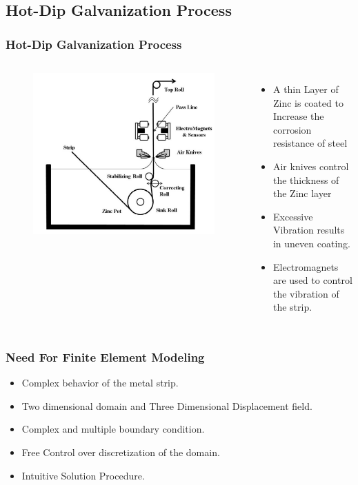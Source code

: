 \documentclass[9pt]{beamer}
\begin{document}
\subsection{Hot-Dip Galvanization Process}
\begin{frame}
\frametitle{Hot-Dip Galvanization Process}
\begin{columns}

\begin{figure}[h!]
  \includegraphics[width=1\linewidth,trim={0 0 0 1cm},clip]{hotdip.png}
\end{figure}
\begin{itemize}
\item A thin Layer of Zinc is coated to Increase the corrosion resistance of steel
\item Air knives control the thickness of the Zinc layer
\item Excessive Vibration results in uneven coating.
\item Electromagnets are used to control the  vibration of the strip. 
\end{itemize}
\end{columns}
\end{frame}




\begin{frame}
\frametitle{Need For Finite Element Modeling}

\begin{itemize}
\item Complex behavior of the metal strip.
\item Two dimensional domain and Three Dimensional Displacement field.
\item Complex and multiple boundary condition.
\item Free Control over discretization of the domain.
\item Intuitive Solution Procedure.
\end{itemize}

\end{frame}
\end{document}
